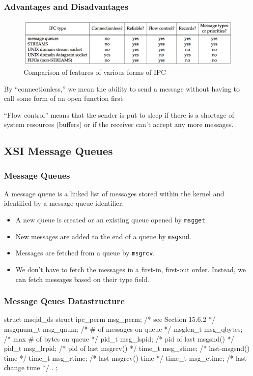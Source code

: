 \documentclass[newPxFont,sthlmFooter,nooffset]{beamer}
\begin{document}
\begin{frame}[t]
  \frametitle{Advantages and Disadvantages}
  \begin{figure}[h]
    \centering
    \includegraphics[width=\linewidth]{figures/fig15_25-comparison.png}
    \caption{Comparison of features of various forms of IPC}
  \end{figure}

By ``connectionless,'' we mean the ability to send a message without having to call some form of an open function first

``Flow control'' means that the sender is put to sleep if there is a shortage of system resources (buffers) or if the receiver can’t accept any more messages.
\end{frame}


\subsection{XSI Message Queues}
\begin{frame}[t]
  \frametitle{Message Queues}
A message queue is a linked list of messages stored within the kernel and identified by a message queue identifier.
\begin{itemize}
\item A new queue is created or an existing queue opened by \texttt{msgget}.
\item New messages are added to the end of a queue by \texttt{msgsnd}.
\item Messages are fetched from a queue by \texttt{msgrcv}.
\item We don’t have to fetch the messages in a first-in, first-out order. Instead, we can fetch messages based on their type field.
\end{itemize}
\end{frame}



\begin{frame}[t, fragile]
  \frametitle{Message Qeues Datastructure}
\begin{codedefnb}
struct msqid_ds {
  struct ipc_perm  msg_perm;   /* see Section 15.6.2 */
  msgqnum_t        msg_qnum;   /* # of messages on queue */
  msglen_t         msg_qbytes; /* max # of bytes on queue */
  pid_t            msg_lspid;  /* pid of last msgsnd() */
  pid_t            msg_lrpid;  /* pid of last msgrcv() */
  time_t           msg_stime;  /* last-msgsnd() time */
  time_t           msg_rtime;  /* last-msgrcv() time */
  time_t           msg_ctime;  /* last-change time */
. };
\end{codedefnb}
\end{frame}
\end{document}
